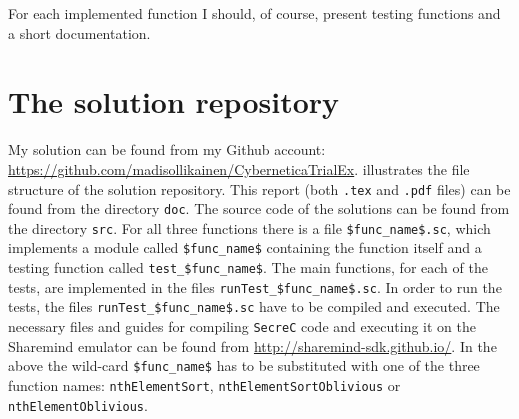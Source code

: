 \documentclass[11pt]{article}
\newcommand{\ct}[1]{\texttt{#1}}
\newcommand{\SC}{\ct{SecreC}\xspace}
\begin{document}
For each implemented function I should, of course, present testing functions and a short documentation. 


\section{The solution repository} %
\label{sec:the_solution_repository}

My solution can be found from my Github account: \url{https://github.com/madisollikainen/CyberneticaTrialEx}.  illustrates the file structure of the solution repository. This report (both \ct{.tex} and \ct{.pdf} files) can be found from the directory \ct{doc}. The source code of the solutions can be found from the directory \ct{src}. For all three functions there is a file \ct{\$func\_name\$.sc}, which implements a module called \ct{\$func\_name\$} containing the function itself and a testing function called \ct{test\_\$func\_name\$}. The main functions, for each of the tests, are implemented in the files \ct{runTest\_\$func\_name\$.sc}. In order to run the tests, the files \ct{runTest\_\$func\_name\$.sc} have to be compiled and executed. The necessary files and guides for compiling \SC code and executing it on the Sharemind emulator can be found from \url{http://sharemind-sdk.github.io/}. In the above the wild-card \ct{\$func\_name\$} has to be substituted with one of the three function names: \ct{nthElementSort}, \ct{nthElementSortOblivious} or \ct{nthElementOblivious}.


\end{document}
